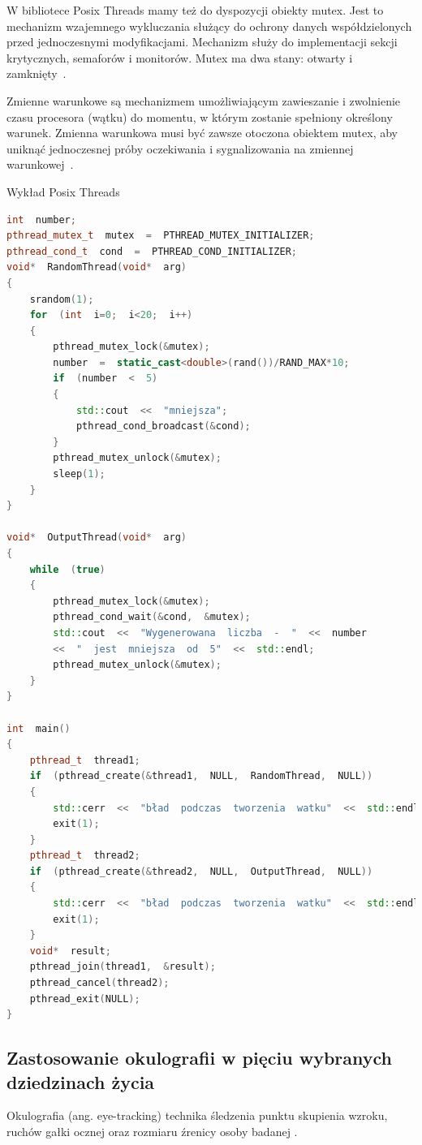 \documentclass[wi]{zut}
\begin{document}
W bibliotece Posix Threads mamy też do dyspozycji obiekty mutex. Jest to mechanizm wzajemnego wykluczania służący do ochrony danych współdzielonych przed jednoczesnymi modyfikacjami. Mechanizm służy do implementacji sekcji krytycznych, semaforów i monitorów. Mutex ma dwa stany: otwarty i zamknięty~\cite{Palkowski_POSIX}.

Zmienne warunkowe są mechanizmem umożliwiającym zawieszanie i zwolnienie czasu procesora (wątku) do momentu, w którym zostanie spełniony określony warunek. Zmienna warunkowa musi być zawsze otoczona obiektem mutex, aby uniknąć jednoczesnej próby oczekiwania i sygnalizowania na zmiennej warunkowej~\cite{Palkowski_POSIX}.

{Wykład Posix Threads \cite{Palkowski_POSIX}}{\label{kod:przyklad}}
\begin{lstlisting}[language=C++]
int  number;
pthread_mutex_t  mutex  =  PTHREAD_MUTEX_INITIALIZER;
pthread_cond_t  cond  =  PTHREAD_COND_INITIALIZER;
void*  RandomThread(void*  arg)
{
	srandom(1);
	for  (int  i=0;  i<20;  i++)
	{
		pthread_mutex_lock(&mutex);
		number  =  static_cast<double>(rand())/RAND_MAX*10;
		if  (number  <  5)
		{
			std::cout  <<  "mniejsza";
			pthread_cond_broadcast(&cond);
		}
		pthread_mutex_unlock(&mutex);
		sleep(1);
	}
}

void*  OutputThread(void*  arg)
{
	while  (true)
	{	
		pthread_mutex_lock(&mutex);
		pthread_cond_wait(&cond,  &mutex);
		std::cout  <<  "Wygenerowana  liczba  -  "  <<  number
		<<  "  jest  mniejsza  od  5"  <<  std::endl;
		pthread_mutex_unlock(&mutex);
	}
}

int  main()
{
	pthread_t  thread1;
	if  (pthread_create(&thread1,  NULL,  RandomThread,  NULL))
	{
		std::cerr  <<  "bład  podczas  tworzenia  watku"  <<  std::endl;
		exit(1);
	}
	pthread_t  thread2;
	if  (pthread_create(&thread2,  NULL,  OutputThread,  NULL))
	{
		std::cerr  <<  "bład  podczas  tworzenia  watku"  <<  std::endl;
		exit(1);
	}
	void*  result;
	pthread_join(thread1,  &result);
	pthread_cancel(thread2);
	pthread_exit(NULL);
}
\end{lstlisting}

\subsection{Zastosowanie okulografii w pięciu wybranych dziedzinach życia}

Okulografia (ang. eye-tracking) technika śledzenia punktu skupienia wzroku, ruchów gałki ocznej oraz rozmiaru źrenicy osoby badanej \cite{wiki:Okulografia}.
\end{document}
